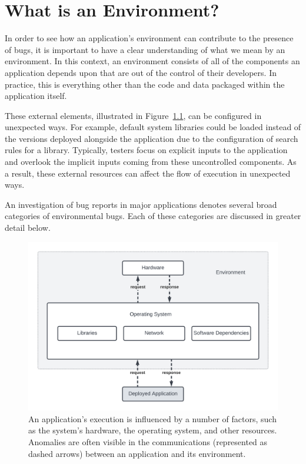\chapter{What is an Environment?}
\label{chap:background}

In order to see how an application's environment can contribute to the presence of bugs, it is important
to have a clear understanding
of what we mean by an environment. In this context, an environment consists of
all of the components an application depends upon
that are out of the control of their developers.
In practice, this is everything other than the code and data packaged
within the application itself.


These external elements,
illustrated in Figure~\ref{fig:environment},
can be
configured in unexpected ways.
For example, default system libraries could be loaded instead of
the versions deployed alongside the application due to the configuration of search rules for a library. 
Typically, testers
focus on explicit inputs to the application
and overlook the implicit inputs
coming from these uncontrolled components. As a result, these external resources can affect the flow of execution in unexpected ways.

An investigation of bug reports in major applications denotes several broad categories of environmental bugs. Each of these categories are discussed in greater detail below.

\begin{figure}[ht]
\centering
  \includegraphics[frame,scale=.85]{chapter2/figures/environment}
  \caption[Overview of Environment Components]{
    An application's execution is influenced by a number of factors, such as the system's hardware, the
    operating system,
    and other resources.  Anomalies are often visible in the communications (represented as dashed arrows) between an application and its environment.
   }
  \label{fig:environment}
\end{figure}


